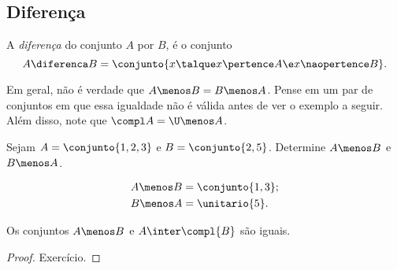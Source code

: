 \subsection{Diferença}

\begin{definition}
	\label{def:setminus}
	A \emph{diferença} do conjunto $A$ por $B$, é o conjunto
	\[
		A \diferenca B = \conjunto{ x \talque  x \pertence A \e x \naopertence B}.
	\]
\end{definition}

\begin{remark}
	Em geral, não é verdade que $A \menos B = B \menos A$. Pense em um par de conjuntos em que essa igualdade não é válida antes de ver o exemplo a seguir. Além disso, note que $\compl A = \U \menos A$.
\end{remark}

\begin{example}
	Sejam $A = \conjunto{1, 2, 3}$ e $ B = \conjunto{2,5}$. Determine $A \menos B$ e $B \menos A$.
\end{example}
	
\begin{solution}
	\begin{align*}
		&A \menos B = \conjunto{1,3};\\
		&B \menos A = \unitario{5}.
	\end{align*}
\end{solution}

\begin{proposition}
Os conjuntos $A\menos B$ e $A\inter \compl{B}$ são iguais.
	\begin{proof}
		Exercício.
	\end{proof}
\end{proposition}